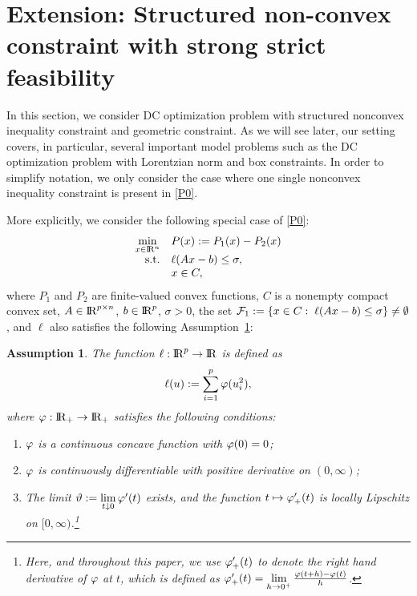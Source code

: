 \documentclass[10pt]{article}
\numberwithin{equation}{section}
\newtheorem{assumption}{Assumption}[section]
\def\R{{\rm I\!R}}
\begin{document}
\section{Extension: Structured non-convex constraint with strong strict feasibility}\label{sec4}

In this section, we consider DC optimization problem with structured nonconvex inequality constraint and geometric constraint. As we will see later, our setting covers, in particular, several important model problems such as the DC optimization problem with Lorentzian norm and box constraints. In order to simplify notation, we only consider the case where one single nonconvex inequality constraint is present in \eqref{P0}.

More explicitly, we consider the following special case of \eqref{P0}:
\begin{equation}\label{P1}
  \begin{array}{rl}
\min\limits_{x\in\R^n} & P(x) := P_1(x) - P_2(x)\\
{\rm s.t.} & \ell(Ax - b)\leq \sigma,\\
           & x\in C,
  \end{array}
\end{equation}
where $P_1$ and $P_2$ are {\color{black}finite-valued convex} functions, $C$ is a nonempty compact convex set, $A\in\R^{p\times n}$, $b\in\R^p$,  $\sigma >0$, the set ${\cal F}_1:= \{x\in C:\; \ell(Ax - b)\le \sigma\}\neq \emptyset$, and $\ell$ also satisfies the following Assumption~\ref{gassum}:
\begin{assumption}\label{gassum}
The function $\ell:\R^p\to \R$ is defined as
\[
\ell(u):= \sum_{i=1}^{p} {\color{black} \varphi}(u_i^2),
\]
where ${\color{black} \varphi}:\R_+\rightarrow \R_+$ satisfies the following conditions:
\begin{enumerate}[{\rm (i)}]
  \item ${\color{black} \varphi}$ is a continuous concave function with ${\color{black} \varphi}(0) = 0$;
  \item ${\color{black} \varphi}$ is continuously differentiable with positive derivative on $(0, \infty)$;
  \item The limit $\vartheta:= \lim\limits_{t\downarrow 0}{\color{black} \varphi}'(t)$ exists, and the function $t\mapsto {\color{black} \varphi}'_+(t)$ is locally Lipschitz on $[0,\infty)$.\footnote{Here, and throughout this paper, we use ${\color{black} \varphi}'_+(t)$ to denote the right hand derivative of ${\color{black} \varphi}$ at $t$, which is defined as ${\color{black} \varphi}'_+(t)=\lim\limits_{h \rightarrow 0^+}\frac{{\color{black} \varphi}(t+h)-{\color{black} \varphi}(t)}{h}$.}
\end{enumerate}
\end{assumption}
\end{document}
